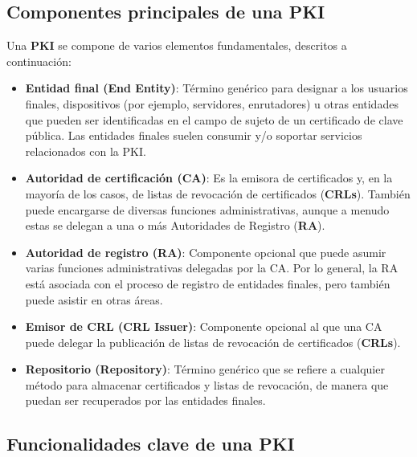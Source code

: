 \subsection{Componentes principales de una PKI}

Una \textbf{PKI} se compone de varios elementos fundamentales, descritos a continuación:

\begin{itemize}
    \item \textbf{Entidad final (End Entity)}: Término genérico para designar a los usuarios finales, dispositivos (por ejemplo, servidores, enrutadores) u otras entidades que pueden ser identificadas en el campo de sujeto de un certificado de clave pública. Las entidades finales suelen consumir y/o soportar servicios relacionados con la PKI.
    
    \item \textbf{Autoridad de certificación (CA)}: Es la emisora de certificados y, en la mayoría de los casos, de listas de revocación de certificados (\textbf{CRLs}). También puede encargarse de diversas funciones administrativas, aunque a menudo estas se delegan a una o más Autoridades de Registro (\textbf{RA}).
    
    \item \textbf{Autoridad de registro (RA)}: Componente opcional que puede asumir varias funciones administrativas delegadas por la CA. Por lo general, la RA está asociada con el proceso de registro de entidades finales, pero también puede asistir en otras áreas.
    
    \item \textbf{Emisor de CRL (CRL Issuer)}: Componente opcional al que una CA puede delegar la publicación de listas de revocación de certificados (\textbf{CRLs}).
    
    \item \textbf{Repositorio (Repository)}: Término genérico que se refiere a cualquier método para almacenar certificados y listas de revocación, de manera que puedan ser recuperados por las entidades finales.
\end{itemize}

\subsection{Funcionalidades clave de una PKI}


